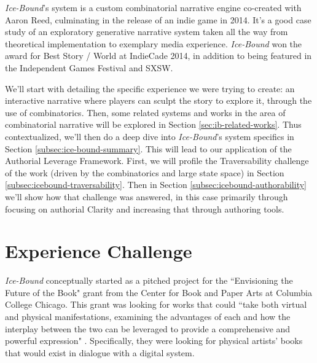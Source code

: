 
\textit{Ice-Bound}'s system is a custom combinatorial narrative engine co-created with Aaron Reed, culminating in the release of an indie game in 2014. It's a good case study of an exploratory generative narrative system taken all the way from theoretical implementation to exemplary media experience. \textit{Ice-Bound} won the award for Best Story / World at IndieCade 2014, in addition to being featured in the Independent Games Festival and SXSW.

We'll start with detailing the specific experience we were trying to create: an interactive narrative where players can sculpt the story to explore it, through the use of combinatorics. Then, some related systems and works in the area of combinatorial narrative will be explored in Section \ref{sec:ib-related-works}. Thus contextualized, we'll then do a deep dive into \textit{Ice-Bound}'s system specifics in Section \ref{subsec:ice-bound-summary}. This will lead to our application of the Authorial Leverage Framework. First, we will profile the Traversability challenge of the work (driven by the combinatorics and large state space) in Section \ref{subsec:icebound-traversability}. Then in Section \ref{subsec:icebound-authorability} we'll show how that challenge was answered, in this case primarily through focusing on authorial Clarity and increasing that through authoring tools.

\section{Experience Challenge}\label{sec:ib-experience-challenge}

\textit{Ice-Bound} conceptually started as a pitched project for the ``Envisioning the Future of the Book" grant from the Center for Book and Paper Arts at Columbia College Chicago. This grant was looking for works that could ``take both virtual and physical manifestations, examining the advantages of each and how the interplay between the two can be leveraged to provide a comprehensive and powerful expression" \cite{rhizome_2012}. Specifically, they were looking for physical artists' books that would exist in dialogue with a digital system.

